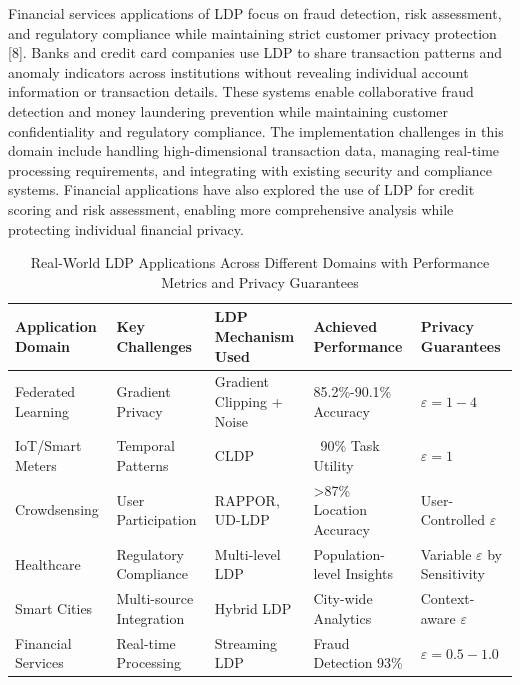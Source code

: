 \documentclass[conference]{IEEEtran}
\begin{document}
Financial services applications of LDP focus on fraud detection, risk assessment, and regulatory compliance while maintaining strict customer privacy protection [8]. Banks and credit card companies use LDP to share transaction patterns and anomaly indicators across institutions without revealing individual account information or transaction details. These systems enable collaborative fraud detection and money laundering prevention while maintaining customer confidentiality and regulatory compliance. The implementation challenges in this domain include handling high-dimensional transaction data, managing real-time processing requirements, and integrating with existing security and compliance systems. Financial applications have also explored the use of LDP for credit scoring and risk assessment, enabling more comprehensive analysis while protecting individual financial privacy.

\begin{table}[h]
\centering
\renewcommand{\arraystretch}{2} 
\caption{Real-World LDP Applications Across Different Domains with Performance Metrics and Privacy Guarantees}
\begin{tabular}{|p{1.25cm}|p{1.25cm}|p{1.35cm}|p{1.35cm}|p{1.25cm}|}
\hline
\textbf{Application Domain} & \textbf{Key Challenges} & \textbf{LDP Mechanism Used} & \textbf{Achieved Performance} & \textbf{Privacy Guarantees} \\
\hline
Federated Learning & Gradient Privacy & Gradient Clipping + Noise & 85.2\%-90.1\% Accuracy & $\varepsilon = 1-4$ \\
\hline
IoT/Smart Meters & Temporal Patterns & CLDP & ~90\% Task Utility & $\varepsilon = 1$ \\
\hline
Crowdsensing & User Participation & RAPPOR, UD-LDP & >87\% Location Accuracy & User-Controlled $\varepsilon$ \\
\hline
Healthcare & Regulatory Compliance & Multi-level LDP & Population-level Insights & Variable $\varepsilon$ by Sensitivity \\
\hline
Smart Cities & Multi-source Integration & Hybrid LDP & City-wide Analytics & Context-aware $\varepsilon$ \\
\hline
Financial Services & Real-time Processing & Streaming LDP & Fraud Detection 93\% & $\varepsilon = 0.5-1.0$ \\
\hline
\end{tabular}
\end{table}
\end{document}
